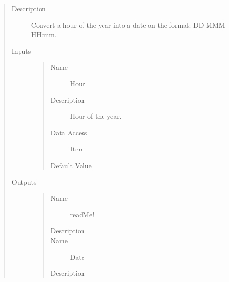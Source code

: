 \documentclass[letterpaper,10pt,english]{sphinxmanual}
\begin{document}
\begin{quote}\begin{description}
\item[{Description}] \leavevmode
Convert a hour of the year into a date on the format: DD MMM HH:mm.

\item[{Inputs}] \leavevmode\begin{quote}\begin{description}
\item[{Name}] \leavevmode
Hour

\item[{Description}] \leavevmode
Hour of the year.

\item[{Data Access}] \leavevmode
Item

\item[{Default Value}] \leavevmode
{}

\end{description}\end{quote}

\item[{Outputs}] \leavevmode\begin{quote}\begin{description}
\item[{Name}] \leavevmode
readMe!

\item[{Description}] \leavevmode
{}

\item[{Name}] \leavevmode
Date

\item[{Description}] \leavevmode
{}

\end{description}\end{quote}

\end{description}\end{quote}
\end{document}
